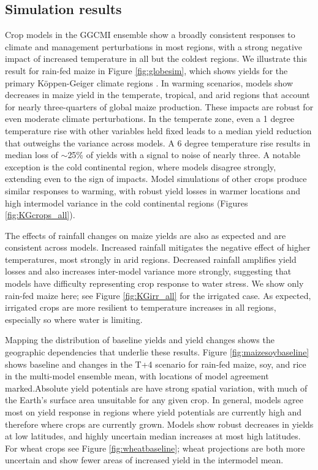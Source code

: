 \documentclass[preprint, 5p, times, twocolumn]{elsarticle}
\begin{document}
\subsection{Simulation results}
Crop models in the GGCMI ensemble show a broadly consistent responses to climate and management perturbations in most regions, with a strong negative impact of increased temperature in all but the coldest regions. We illustrate this result for rain-fed maize in Figure \ref{fig:globesim}, which shows yields for the primary K\"{o}ppen-Geiger climate regions \citep{rubel2010}. 
In warming scenarios, models show decreases in maize yield in the temperate, tropical, and arid regions that account for nearly three-quarters of global maize production. These impacts are robust for even moderate climate perturbations. In the temperate zone, even a 1 degree temperature rise with other variables held fixed leads to a median yield reduction that outweighs the variance across models. A 6 degree temperature rise results in median loss of $\sim$25\% of yields with a signal to noise of nearly three. A notable exception is the cold continental region, where models disagree strongly, extending even to the sign of impacts. Model simulations of other crops produce similar responses to warming, with robust yield losses in warmer locations and high intermodel variance in the cold continental regions (Figures \ref{fig:KGcrops_all}).

The effects of rainfall changes on maize yields are also as expected and are consistent across models. Increased rainfall mitigates the negative effect of higher temperatures, most strongly in arid regions. Decreased rainfall amplifies yield losses and also increases inter-model variance more strongly, suggesting that models have difficulty representing crop response to water stress.  We show only rain-fed maize here; see Figure \ref{fig:KGirr_all} for the irrigated case. As expected, irrigated crops are more resilient to temperature increases in all regions, especially so where water is limiting.  

Mapping the distribution of baseline yields and yield changes shows the geographic dependencies that underlie these results. Figure \ref{fig:maizesoybaseline} shows baseline and changes in the T+4 scenario for rain-fed maize, soy, and rice in the multi-model ensemble mean, with locations of model agreement marked.Absolute yield potentials are have strong spatial variation, with much of the Earth's surface area unsuitable for any given crop. In general, models agree most on yield response in regions where yield potentials are currently high and therefore where crops are currently grown. Models show robust decreases in yields at low latitudes, and highly uncertain median increases at most high latitudes. For wheat crops see Figure \ref{fig:wheatbaseline}; wheat projections are both more uncertain and show fewer areas of increased yield in the intermodel mean. 
\end{document}
